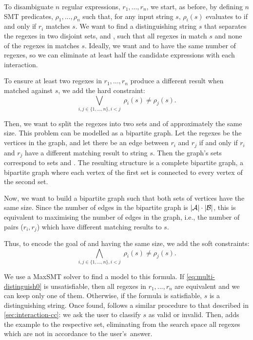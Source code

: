 To disambiguate \(n\) regular expressions, \(r_1, ..., r_n\), we start, as before, by defining \(n\) \ac{SMT} predicates, \(\rho_1, ..., \rho_n\) such that, for any input string \(s\), \(\rho_i(s)\) evaluates to \true{} if and only if \(r_i\) matches \(s\).
We want to find a distinguishing string \(s\) that separates the regexes in two disjoint sets,  and , such that all regexes in  match \(s\) and none of the regexes in  matches \(s\). Ideally, we want  and  to have the same number of regexes, so we can eliminate at least half the candidate expressions with each interaction.

To ensure at least two regexes in \(r_1, ..., r_n\) produce a different result when matched against \(s\), we add the hard constraint:
\begin{equation}\label{eq:multi-distinguish0}
    \bigvee_{i,j \in \{1, ..., n\}, i<j} \; \rho_i(s) \ne \rho_j(s).
\end{equation}

\noindent
Then, we want to split the regexes into two sets  and  of approximately the same size. This problem can be modelled as a bipartite graph. Let the regexes be the vertices in the graph, and let there be an edge between \(r_i\) and \(r_j\) if and only if \(r_i\) and \(r_j\) have a different matching result to string \(s\). Then the graph's sets correspond to sets  and . The resulting structure is a complete bipartite graph, a bipartite graph where each vertex of the first set is connected to every vertex of the second set.

Now, we want to build a bipartite graph such that both sets of vertices have the same size. Since the number of edges in the bipartite graph is \(|{\mathcal{A}}| \cdot |{\mathcal{B}}|\), this is equivalent to maximising the number of edges in the graph, i.e., the number of pairs (\(r_i, r_j\)) which have different matching results to \(s\).

Thus, to encode the goal of  and  having the same size, we add the soft constraints:
\begin{equation}\label{eq:multi-distinguish}
    \bigwedge_{i,j \in \{1, ..., n\}, i<j} \; \rho_i(s) \ne \rho_j(s).
\end{equation}

We use a \ac{MaxSMT} solver to find a model to this formula. If  \eqref{eq:multi-distinguish0} is unsatisfiable, then all regexes in \(r_1, ..., r_n\) are equivalent and we can keep only one of them. Otherwise, if the formula is satisfiable, \(s\) is a distinguishing string. Once found, \Forest{} follows a similar procedure to that described in \autoref{sec:interaction-cc}: we ask the user to classify \(s\) as valid or invalid. Then, \Forest{} adds the example to the respective set, eliminating from the search space all regexes which are not in accordance to the user's~answer. 


